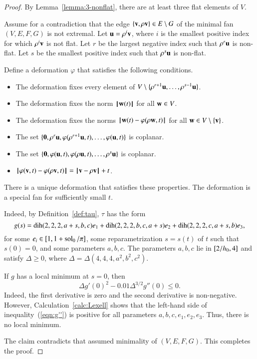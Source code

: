 \begin{proof} 
By Lemma~\ref{lemma:3-nonflat}, there are at least three flat elements of $V$.

Assume for a contradiction that the edge $\{{\mathbf v},\rho{\mathbf v}\}\in E\setminus G$ of the minimal fan $(V,E,F,G)$ is not extremal.  Let ${\mathbf u} = \rho^i{\mathbf v}$, where $i$ is the smallest positive index for which $\rho^i{\mathbf v}$ is not flat.
Let $r$ be the largest negative index such that
$\rho^r{\mathbf u}$ is non-flat.  Let $s$ be the smallest positive index such that
$\rho^s{\mathbf u}$ is non-flat.

Define a deformation $\varphi$ that satisfies the following conditions.
\begin{itemize}
\item The deformation fixes every element of $V\setminus\{\rho^{r+1}{\mathbf u},\ldots,\rho^{s-1}{\mathbf u}\}$.  
\item The deformation  fixes the norm ${{\hskip0.1em|\hskip-0.15em|\hskip0.1em}{\mathbf w}(t){\hskip0.1em|\hskip-0.15em|\hskip0.1em}}$ for all ${\mathbf w}\in V$.  
\item The deformation  fixes the norms ${\hskip0.1em|\hskip-0.15em|\hskip0.1em}{\mathbf w}(t) - \varphi(\rho {\mathbf w},t){\hskip0.1em|\hskip-0.15em|\hskip0.1em}$ for all ${\mathbf w}\in V\setminus\{{\mathbf v}\}$.  
\item The set $\{{\mathbf 0},\rho^r{\mathbf u},\varphi(\rho^{r+1}{\mathbf u},t),\ldots,\varphi({\mathbf u},t)\}$ is coplanar.
\item The set $\{{\mathbf 0},\varphi({\mathbf u},t),\varphi(\rho{\mathbf u},t),\ldots,\rho^s{\mathbf u}\}$ is coplanar.
\item ${\hskip0.1em|\hskip-0.15em|\hskip0.1em}\varphi({\mathbf v},t) - \varphi(\rho{\mathbf v},t){\hskip0.1em|\hskip-0.15em|\hskip0.1em} = {\hskip0.1em|\hskip-0.15em|\hskip0.1em}{\mathbf v} - \rho{\mathbf v}{\hskip0.1em|\hskip-0.15em|\hskip0.1em}+t$.
\end{itemize}
There is a unique deformation that satisfies these properties.  The deformation is a special fan for sufficiently small $t$.

Indeed,  by Definition~\ref{def:tau}, $\tau$ has the form
$$
g(s) = \operatorname{dih}(2,2,2,a+s,b,c) e_1 + \operatorname{dih}(2,2,2,b,c,a+s) e_2 + \operatorname{dih}(2,2,2,c,a+s,b) e_3,
$$
for some $e_i\in[1,1+\operatorname{sol}_0/\pi]$, some reparametrization $s=s(t)$ of $t$ such that $s(0)=0$, and some parameters $a,b,c$.
The parameters $a,b,c$ lie in $[2/{h_0},4]$ and satisfy $\Delta\ge0$, where  $\Delta = \Delta(4,4,4,a^2,b^2,c^2)$.

If $g$ has a local minimum at $s=0$, then
\begin{equation}\label{eqn:g''}
\Delta g'(0)^2 - 0.01\Delta^{3/2} g''(0) \le 0.
\end{equation}
Indeed, the first derivative is zero and the second derivative is non-negative.
However, Calculation~\ref{calc:Lexell}
shows that the left-hand side of inequality~(\ref{eqn:g''}) is positive for all parameters $a,b,c,e_1,e_2,e_3$.
Thus, there is no local minimum.

The claim contradicts that assumed minimality of $(V,E,F,G)$.  This completes the proof.  
\end{proof}


